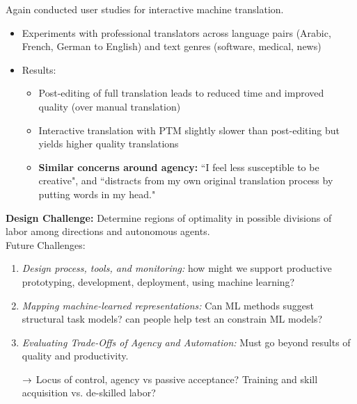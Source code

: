 Again conducted user studies for interactive machine translation.
\begin{itemize}
\item Experiments with professional translators across language pairs (Arabic, French, German to English) and text genres (software, medical, news)
\item Results: 
\begin{itemize}
    \item Post-editing of full translation leads to reduced time and improved quality (over manual translation)
    \item Interactive translation with PTM slightly slower than post-editing but yields higher quality translations
    \item {\bf Similar concerns around agency:} ``I feel less susceptible to be creative", and ``distracts from my own original translation process by putting words in my head."
\end{itemize}


\end{itemize}


{\bf Design Challenge:} Determine regions of optimality in possible divisions of labor among directions and autonomous agents. \\

Future Challenges:
\begin{enumerate}
    \item {\it Design process, tools, and monitoring:} how might we support productive prototyping, development,  deployment, using machine learning?
    
    \item {\it Mapping machine-learned representations:} Can ML methods suggest structural task models? can people help test an constrain ML models?

    \item {\it Evaluating Trade-Offs of Agency and Automation:} Must go beyond results of quality and productivity.
    
    $\rightarrow$ Locus of control, agency vs passive acceptance? Training and skill acquisition vs. de-skilled labor?
\end{enumerate} 

